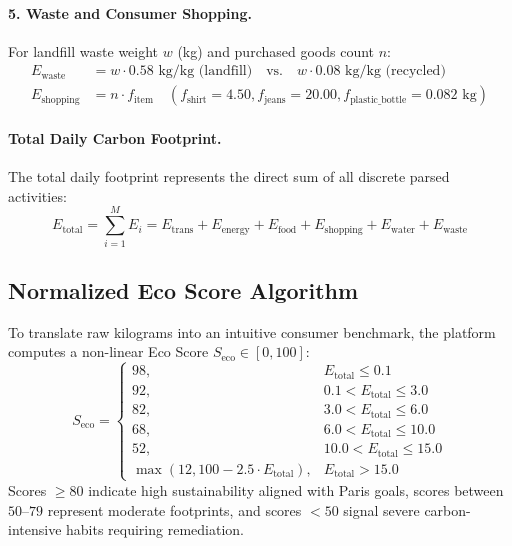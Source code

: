 \documentclass[12pt,a4paper]{article}
\begin{document}
\paragraph{5. Waste and Consumer Shopping.}
For landfill waste weight $w$ (kg) and purchased goods count $n$:
\begin{align}
    E_{\text{waste}} &= w \cdot 0.58\text{ kg/kg (landfill)} \quad \text{vs.} \quad w \cdot 0.08\text{ kg/kg (recycled)} \\
    E_{\text{shopping}} &= n \cdot f_{\text{item}} \quad (f_{\text{shirt}} = 4.50, f_{\text{jeans}} = 20.00, f_{\text{plastic\_bottle}} = 0.082\text{ kg})
\end{align}

\paragraph{Total Daily Carbon Footprint.}
The total daily footprint represents the direct sum of all discrete parsed activities:
\begin{equation}
    E_{\text{total}} = \sum_{i=1}^{M} E_i = E_{\text{trans}} + E_{\text{energy}} + E_{\text{food}} + E_{\text{shopping}} + E_{\text{water}} + E_{\text{waste}}
\end{equation}

\subsection{Normalized Eco Score Algorithm}
To translate raw kilograms into an intuitive consumer benchmark, the platform computes a non-linear Eco Score $S_{\text{eco}} \in [0, 100]$:
\begin{equation}
    S_{\text{eco}} = 
    \begin{cases}
        98, & E_{\text{total}} \le 0.1 \\
        92, & 0.1 < E_{\text{total}} \le 3.0 \\
        82, & 3.0 < E_{\text{total}} \le 6.0 \\
        68, & 6.0 < E_{\text{total}} \le 10.0 \\
        52, & 10.0 < E_{\text{total}} \le 15.0 \\
        \max\left(12, 100 - 2.5 \cdot E_{\text{total}}\right), & E_{\text{total}} > 15.0
    \end{cases}
\end{equation}
Scores $\ge 80$ indicate high sustainability aligned with Paris goals, scores between $50\text{--}79$ represent moderate footprints, and scores $<50$ signal severe carbon-intensive habits requiring remediation.
\end{document}
